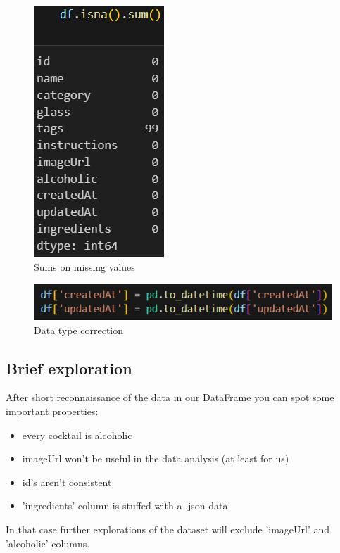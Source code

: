 \documentclass[a4paper]{article}
\begin{document}
\begin{multicols}{2}

\begin{figure}[H]
    \centering
    \includegraphics[width=0.4\linewidth]{types.png}
    \caption{Sums on missing values}
    \label{fig:enter-label}
\end{figure}

\columnbreak

\begin{figure}[H]
    \centering
    \includegraphics[width=1\linewidth]{type correction.png}
    \caption{Data type correction}
    \label{fig:enter-label}
\end{figure}

\end{multicols}

\subsection{Brief exploration}
After short reconnaissance of the data in our DataFrame you can spot some important properties:
\begin{itemize}
    \item every cocktail is alcoholic
    \item imageUrl won't be useful in the data analysis (at least for us)
    \item id's aren't consistent
    \item 'ingredients' column is stuffed with a .json data
\end{itemize}
In that case further explorations of the dataset will exclude 'imageUrl' and 'alcoholic' columns.
\end{document}
